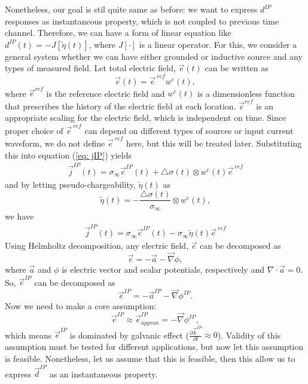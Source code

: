 \documentclass[a4paper, 11pt]{article}
\renewcommand{\div}{\nabla\cdot}
\newcommand{\grad}{\vec \nabla}
\newcommand{\siginf}{\sigma_\infty}
\newcommand{\dsig}{\triangle\sigma}
\renewcommand {\j}  { {\vec j} }
\renewcommand {\b}  { {\vec b} }
\newcommand {\e}  { {\vec e} }
\renewcommand {\d}  { {\vec d} }
\newcommand{\peta}{\tilde{\eta}}
\newcommand{\dip}{d^{IP}}
\begin{document}
Nonetheless, our goal is stil quite same as before: we want to express $d^{IP}$ responses as instantaneous property, which is not coupled to previous time channel. Therefore, we can have a form of linear equation like $\dip(t) = -J[\peta(t)]$, where $J[\cdot]$ is a linear operator. For this, we consider a general system whether we can have either grounded or inductive source and any types of measured field. Let total electric field, $\e(t)$ can be written as
\begin{equation}
  \e(t) = \e^{\ ref}w^e(t),
  \label{eq: e_with_eref}
\end{equation}
where $\e^{ref}$ is the reference electric field and $w^e(t)$ is a dimensionless function that prescribes the history of the electric field at each location. $\e^{ref}$ is an appropriate scaling for the electric field, which is independent on time.  Since proper choice of $\e^{\ ref}$ can depend on different types of sources or input current waveform, we do not define $\e^{\ ref}$ here, but this will be treated later. Substituting this into equation (\ref{eq: jIP}) yields
\begin{eqnarray*}
  \j^{IP}(t) = \siginf\e^{IP}(t) + \dsig(t)\otimes w^e(t)\e^{\ ref}
\end{eqnarray*}
and by letting pseudo-chargeability, $\peta(t)$ as
\begin{equation}
    \peta(t) = -\frac{\dsig(t)}{\siginf}\otimes w^e(t),
    \label{eq: pseudochargeability}
\end{equation}
we have
\begin{eqnarray}
  \j^{IP}(t) = \siginf\e^{IP}(t) -\siginf \peta(t)\e^{\ ref}
  \label{eq: jip_EMIP}
\end{eqnarray}
Using Helmholtz decomposition, any electric field, $\e$ can be decomposed as
\begin{equation*}
    \e=-\vec{a}-\grad\phi,
\end{equation*}
where $\vec{a}$ and $\phi$ is electric vector and scalar potentials, respectively and $\div\vec{a}=0$. So, $\e^{IP}$ can be decomposed as
\begin{equation*}
  \e^{IP}=-\vec{a}^{IP}-\grad\phi^{IP}.
\end{equation*}
Now we need to make a core assumption:
\begin{equation}
  \e^{IP} \approx  \e^{IP}_{approx} = -\grad\phi^{IP},
  \label{eq: eip_approx}
\end{equation}
which means $\e^{IP}$ is dominated by galvanic effect ($\frac{\partial\b^{IP}}{\partial t}\approx 0$). Validity of this assumption must be tested for different applications, but now let this assumption is feasible. Nonetheless, let us assume that this is feasible, then this allow us to express $\d^{IP}$ as an instantaneous property.
\end{document}
